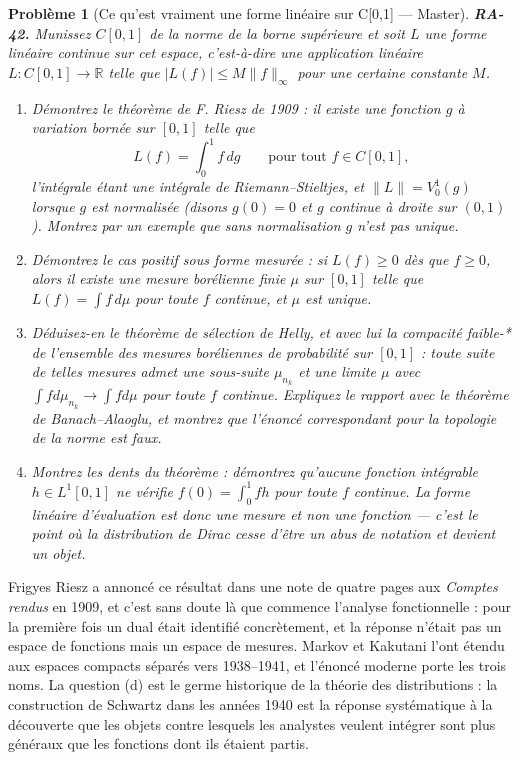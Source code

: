 \documentclass[11pt]{article}
\newtheorem{problem}{Problème}
\begin{document}
\bigskip

\begin{problem}[{Ce qu'est vraiment une forme linéaire sur C[0,1] --- Master}]
\textbf{RA-42.} Munissez $ C[0,1] $ de la norme de la borne supérieure et soit $ L $ une
forme linéaire continue sur cet espace, c'est-à-dire une application linéaire
$ L : C[0,1] \to \mathbb{R} $ telle que $ |L(f)| \le M \|f\|_{\infty} $ pour une certaine
constante $ M $.
\begin{enumerate}
\item[(a)] Démontrez le théorème de F. Riesz de 1909 : il existe une fonction $ g $ à variation bornée
sur $ [0,1] $ telle que
\[ L(f) = \int_0^1 f \, dg \qquad \text{pour tout } f \in C[0,1], \]
l'intégrale étant une intégrale de Riemann--Stieltjes, et $ \|L\| = V_0^1(g) $ lorsque
$ g $ est normalisée (disons $ g(0)=0 $ et $ g $ continue à droite sur $ (0,1) $). Montrez
par un exemple que sans normalisation $ g $ n'est pas unique.
\item[(b)] Démontrez le cas positif sous forme mesurée : si $ L(f) \ge 0 $ dès que $ f \ge 0 $, alors
il existe une mesure borélienne finie $ \mu $ sur $ [0,1] $ telle que $ L(f) = \int f \, d\mu $
pour toute $ f $ continue, et $ \mu $ est unique.
\item[(c)] Déduisez-en le théorème de sélection de Helly, et avec lui la compacité faible-* de l'ensemble
des mesures boréliennes de probabilité sur $ [0,1] $ : toute suite de telles mesures admet une
sous-suite $ \mu_{n_k} $ et une limite $ \mu $ avec $ \int f d\mu_{n_k} \to \int f d\mu $ pour
toute $ f $ continue. Expliquez le rapport avec le théorème de Banach--Alaoglu, et montrez
que l'énoncé correspondant pour la topologie de la norme est faux.
\item[(d)] Montrez les dents du théorème : démontrez qu'aucune fonction intégrable $ h \in L^1[0,1] $ ne
vérifie $ f(0) = \int_0^1 f h $ pour toute $ f $ continue. La forme linéaire d'évaluation est
donc une mesure et non une fonction --- c'est le point où la distribution de Dirac cesse d'être un
abus de notation et devient un objet.
\end{enumerate}

\end{problem}

\noindent Frigyes Riesz a annoncé ce résultat dans une note de quatre pages aux
\textit{Comptes rendus} en 1909, et c'est sans doute là que commence l'analyse fonctionnelle : pour la
première fois un dual était identifié concrètement, et la réponse n'était pas un espace de fonctions
mais un espace de mesures. Markov et Kakutani l'ont étendu aux espaces compacts séparés vers
1938--1941, et l'énoncé moderne porte les trois noms. La question (d) est le germe historique de
la théorie des distributions : la construction de Schwartz dans les années 1940 est la réponse
systématique à la découverte que les objets contre lesquels les analystes veulent intégrer sont plus
généraux que les fonctions dont ils étaient partis.
\end{document}
